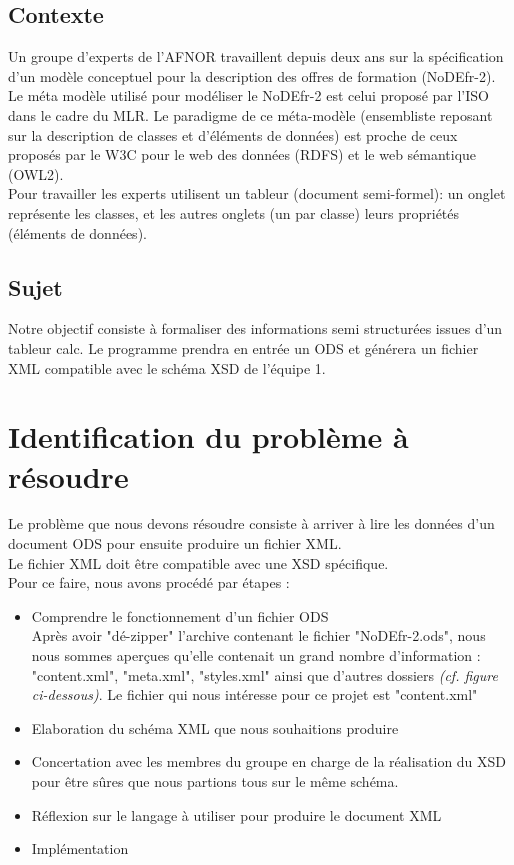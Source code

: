 \documentclass[11pt]{report}
\begin{document}
\section{Contexte}
Un groupe d'experts de l'AFNOR travaillent depuis deux ans sur la spécification d'un modèle conceptuel pour la description des offres de formation (NoDEfr-2). Le méta modèle utilisé pour modéliser le NoDEfr-2 est celui proposé par l'ISO dans le cadre du MLR. Le paradigme de ce méta-modèle (ensembliste reposant sur la description de classes et d'éléments de données) est proche de ceux proposés par le W3C pour le web des données (RDFS) et le web sémantique (OWL2).\\

Pour travailler les experts utilisent un tableur (document semi-formel): un onglet représente les classes, et les autres onglets (un par classe) leurs propriétés (éléments de données).\\


\section{Sujet}
Notre objectif consiste à formaliser des informations semi structurées issues d'un tableur calc. Le programme prendra en entrée un ODS et générera un fichier XML compatible avec le schéma XSD de l'équipe 1.


\chapter{Identification du problème à résoudre}

Le problème que nous devons résoudre consiste à arriver à lire les données d'un document ODS pour ensuite produire un fichier XML.\\
Le fichier XML doit être compatible avec une XSD spécifique.\\

Pour ce faire, nous avons procédé par étapes :
\begin{itemize}
    \item Comprendre le fonctionnement d'un fichier ODS\\
        Après avoir "dé-zipper" l'archive contenant le fichier "NoDEfr-2.ods", nous nous sommes aperçues qu'elle contenait un grand nombre d'information : "content.xml", "meta.xml", "styles.xml" ainsi que d'autres dossiers \textit{(cf. figure ci-dessous)}. Le fichier qui nous intéresse pour ce projet est "content.xml"
    \item Elaboration du schéma XML que nous souhaitions produire
    \item Concertation avec les membres du groupe en charge de la réalisation du XSD pour être sûres que nous partions tous sur le même schéma.
    \item Réflexion sur le langage à utiliser pour produire le document XML
    \item Implémentation
\end{itemize}
\end{document}
